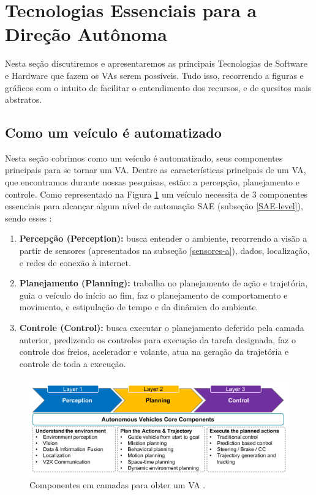 \section{Tecnologias Essenciais para a Direção Autônoma} \label{essencias_di}
Nesta seção discutiremos e apresentaremos as principais Tecnologias de Software e Hardware que fazem os VAs serem possíveis. Tudo isso, recorrendo a figuras e gráficos com o intuito de facilitar o entendimento dos recursos, e de quesitos mais abstratos. 

\subsection{Como um veículo é automatizado} \label{auto}
Nesta seção cobrimos como um veículo é automatizado, seus componentes principais para se tornar um VA. Dentre as características principais de um VA, que encontramos durante nossas pesquisas, estão: a percepção, planejamento e controle.
Como representado na Figura \ref{figura_perception} um veículo necessita de 3 componentes essenciais para alcançar algum nível de automação SAE (subseção \ref{SAE-level}), sendo esses \cite{sensors-yet}:
\begin{enumerate}
 \item \textbf{Percepção (Perception):} busca entender o ambiente, recorrendo a visão a partir de sensores (apresentados na subseção \ref{sensores-a}), dados, localização, e redes de conexão à internet.
\item \textbf{Planejamento (Planning):} trabalha no planejamento de ação e trajetória, guia o veículo do início ao fim, faz o planejamento de comportamento e movimento, e estipulação de tempo e da dinâmica do ambiente.
\item \textbf{Controle (Control):} busca executar o planejamento deferido pela camada anterior, predizendo os controles para execução da tarefa designada, faz o controle dos freios, acelerador e volante, atua na geração da trajetória e controle de toda a execução.
\end{enumerate}

\begin{figure}[H]
\centering
\includegraphics[width=\textwidth]{Figures/perception.png}
\caption{Componentes em camadas para obter um VA \cite{sensors-yet}.}
\label{figura_perception}
\end{figure}

